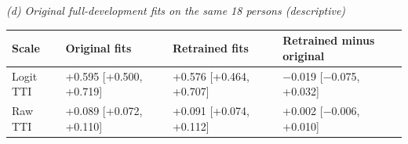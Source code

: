 \medskip
\textit{(d) Original full-development fits on the same 18 persons (descriptive)}\\[2pt]
\begin{tabular}{@{}llll@{}}
\toprule
Scale & Original fits & Retrained fits & Retrained minus original \\
\midrule
Logit TTI & +0.595 [+0.500, +0.719] & +0.576 [+0.464, +0.707] & $-$0.019 [$-$0.075, +0.032] \\
Raw TTI & +0.089 [+0.072, +0.110] & +0.091 [+0.074, +0.112] & +0.002 [$-$0.006, +0.010] \\
\bottomrule
\end{tabular}
